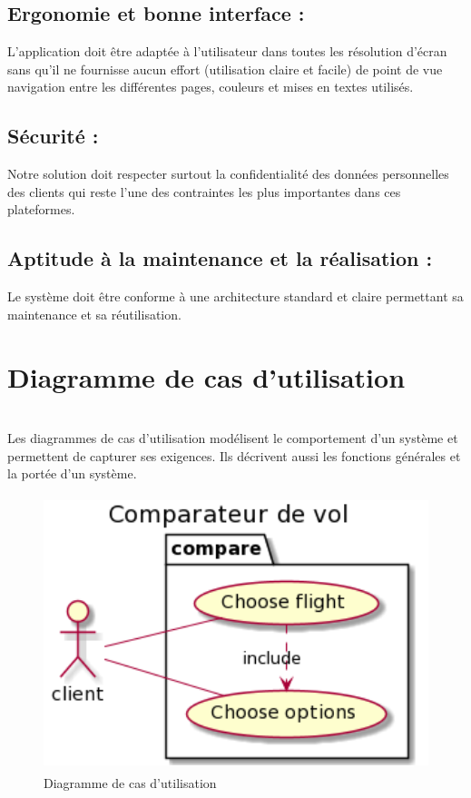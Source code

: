 \subsection{Ergonomie et bonne interface :}
L’application doit être adaptée à l’utilisateur dans toutes les résolution d’écran sans qu’il ne fournisse aucun effort (utilisation claire et facile) de point de vue navigation entre les différentes pages, couleurs et mises en textes utilisés.
\subsection{Sécurité :}
Notre solution doit respecter surtout la confidentialité des données personnelles des clients qui reste l’une des contraintes les plus importantes dans ces plateformes.
\subsection{Aptitude à la maintenance et la réalisation :}
Le système doit être conforme à une architecture standard et claire permettant sa maintenance et sa réutilisation.




\section{Diagramme de cas d'utilisation} \\
Les diagrammes de cas d'utilisation modélisent le comportement d'un système et permettent de capturer ses exigences. Ils décrivent aussi les fonctions générales et la portée d'un système.
\begin{figure}[!h]
\begin{center}
\includegraphics[height=8cm]{Pictures/Use case.png}
\end{center}
\caption{Diagramme de cas d'utilisation}
\end{figure}


